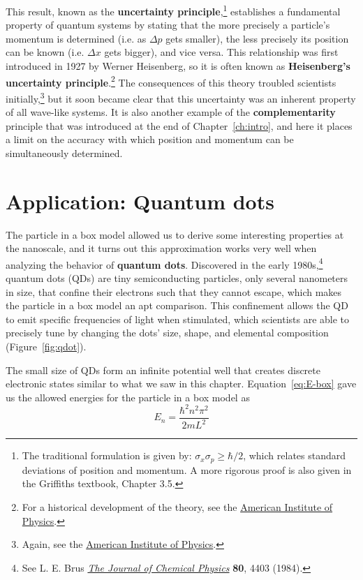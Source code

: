 This result, known as the \textbf{uncertainty principle},\footnote{The traditional formulation is given by: $\sigma_x\sigma_p \ge \hbar/2$, which relates standard deviations of position and momentum. A more rigorous proof is also given in the Griffiths textbook, Chapter 3.5.} establishes a fundamental property of quantum systems by stating that the more precisely a particle's momentum is determined (i.e. as $\Delta p$ gets smaller), the less precisely its position can be known (i.e. $\Delta x$ gets bigger), and vice versa. This relationship was first introduced in 1927 by Werner Heisenberg, so it is often known as \textbf{Heisenberg's uncertainty principle}.\footnote{For a historical development of the theory, see the \href{http://history.aip.org/exhibits/heisenberg/p08.htm}{American Institute of Physics}.} The consequences of this theory troubled scientists initially,\footnote{Again, see the \href{http://history.aip.org/exhibits/heisenberg/p08c.htm}{American Institute of Physics}.} but it soon became clear that this uncertainty was an inherent property of all wave-like systems. It is also another example of the \textbf{complementarity} principle that was introduced at the end of Chapter~\ref{ch:intro}, and here it places a limit on the accuracy with which position and momentum can be simultaneously determined.


\section{Application: Quantum dots}
The particle in a box model allowed us to derive some interesting properties at the nanoscale, and it turns out this approximation works very well when analyzing the behavior of \textbf{quantum dots}. Discovered in the early 1980s,\footnote{See L. E. Brus \href{http://aip.scitation.org/doi/abs/10.1063/1.447218}{\emph{The Journal of Chemical Physics}} \textbf{80}, 4403 (1984).} quantum dots (QDs) are tiny semiconducting particles, only several nanometers in size, that confine their electrons such that they cannot escape, which makes the particle in a box model an apt comparison. This confinement allows the QD to emit specific frequencies of light when stimulated, which scientists are able to precisely tune by changing the dots' size, shape, and elemental composition (Figure~\ref{fig:qdot}). \par 

The small size of QDs form an infinite potential well that creates discrete electronic states similar to what we saw in this chapter. Equation~\ref{eq:E-box} gave us the allowed energies for the particle in a box model as
\begin{equation*}
	E_n = \frac{\hbar^2n^2\pi^2}{2mL^2}
\end{equation*}

